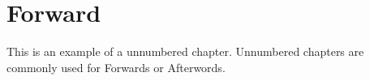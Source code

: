 \chapter*{Forward}
This is an example of a unnumbered chapter.  Unnumbered chapters are commonly used for Forwards or Afterwords.
